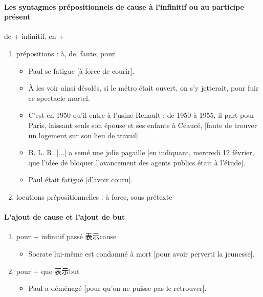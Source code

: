 \documentclass[UTF8]{report}
\begin{document}
\paragraph{Les syntagmes prépositionnels de cause à l’infinitif ou au participe présent}
de + infinitif, en + 
\begin{enumerate}
    \item prépositions : à, de, faute, pour
    \begin{itemize}
        \item Paul se fatigue [à force de courir].
        \item À les voir ainsi désolés, si le métro était ouvert, on s’y jetterait, pour fuir ce spectacle mortel.
        \item C’est en 1950 qu’il entre à l’usine Renault : de 1950 à 1955, il part pour Paris, laissant seuls son épouse et ses enfants à Céaucé, [faute de trouver un logement sur son lieu de travail]
        \item B. L. R. [...] a semé une jolie pagaille [en indiquant, mercredi 12 février, que l’idée de bloquer l’avancement des agents publics était à l’étude].
        \item Paul était fatigué [d’avoir couru].
    \end{itemize}
    \item locutions prépositionnelles : à force, sous prétexte
\end{enumerate}

\paragraph{L’ajout de cause et l’ajout de but}
\begin{enumerate}
    \item pour + infinitif passé 表示cause 
    \begin{itemize}
        \item Socrate lui-même est condamné à mort [pour avoir perverti la jeunesse]. 
    \end{itemize}
    \item pour + que 表示but
    \begin{itemize}
        \item Paul a déménagé [pour qu’on ne puisse pas le retrouver].
    \end{itemize}
\end{enumerate}
\end{document}
